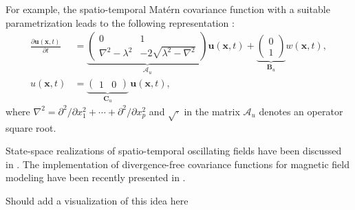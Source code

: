 \documentclass[journal]{IEEEtran}
\newcommand{\simo}[1]{{\color{red}#1}}
\begin{document}
For example, the spatio-temporal Mat\'ern covariance function with a suitable parametrization leads to the following representation \cite{Sarkka+Solin+Hartikainen:2013}:
%
\begin{equation}
\begin{split}
  \frac{\partial \mathbf{u}(\mathbf{x},t)}{\partial t} &= 
       \underbrace{\begin{pmatrix} 
        0 & 1 \\ 
        \nabla^2-\lambda^2
        & -2 \sqrt{\lambda^2-\nabla^2} 
      \end{pmatrix}}_{\mathbf{\mathcal{A}}_u} \mathbf{u}(\mathbf{x},t)
      + \underbrace{\begin{pmatrix} 0 \\ 1 \end{pmatrix}}_{\mathbf{B}_u} w(\mathbf{x},t), \\
      u(\mathbf{x},t) &= \underbrace{\begin{pmatrix} 1 & 0 \end{pmatrix}}_{\mathbf{C}_u} \, \mathbf{u}(\mathbf{x},t),
\end{split}
\label{2dmatern_ss}
\end{equation}
%
where $\nabla^2 = \partial^2 / \partial x_1^2 + \cdots + \partial^2 / \partial x_p^2$ and $\sqrt{\cdot}$ in the matrix $\mathbf{\mathcal{A}}_u$ denotes an operator square root.

State-space realizations of spatio-temporal oscillating fields have been discussed in \cite{Solin+Sarkka:2013}. The implementation of divergence-free covariance functions for magnetic field modeling have been recently presented in \cite{Solin:2015}.

\simo{Should add a visualization of this idea here}
\end{document}
